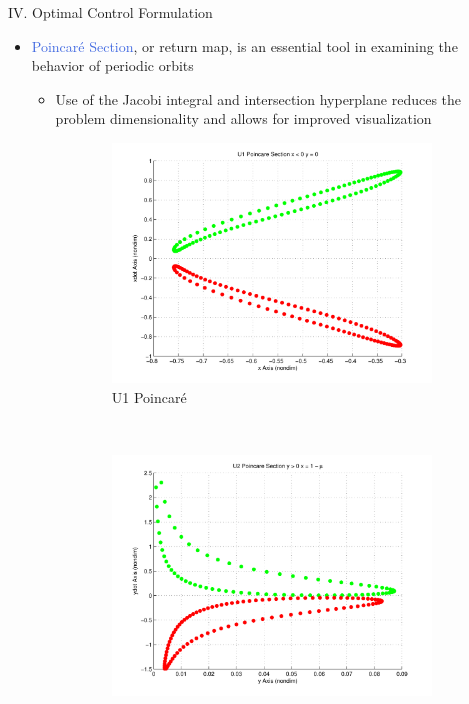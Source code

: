 \documentclass[final, usenames, dvipsnames]{beamer}
\newlength{\twocolwidth}
\def\Emph{\textcolor{RoyalBlue}}
\begin{document}
\begin{frame}[t]
\begin{columns}[T,onlytextwidth]
\begin{column}{\twocolwidth}
\begin{block}{IV. Optimal Control Formulation} %
	\begin{itemize}
		\item \Emph{Poincar\'e Section}, or return map, is an essential tool in examining the behavior of periodic orbits
			\begin{itemize}
				\item Use of the Jacobi integral and intersection hyperplane reduces the problem dimensionality and allows for improved visualization
			\end{itemize}
		\begin{figure}
        	\centering
        	\begin{subfigure}[b]{0.24\columnwidth}
                \includegraphics[width=\columnwidth]{U1_poincare}
                \caption*{U1 Poincar\'e}
                \label{fig:u1_poincare}
        	\end{subfigure}%
        	~%
        	\begin{subfigure}[b]{0.24\columnwidth}
                \includegraphics[width=\columnwidth]{U2_poincare}

\end{subfigure}
\end{figure}
\end{itemize}
\end{block}
\end{column}
\end{columns}
\end{frame}
\end{document}
